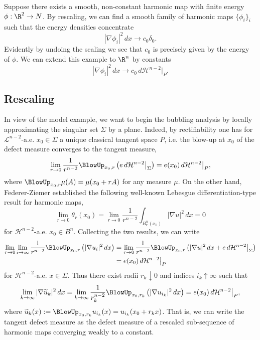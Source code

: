 \documentclass[reqno]{amsart}
\theoremstyle{definition}
\theoremstyle{remark}
\begin{document}
Suppose there exists a smooth, non-constant harmonic map with finite energy $\phi : \R^2 \to N$. By rescaling, we can find a smooth family of harmonic maps $\{ \phi_i \}_i$ such that the energy densities concentrate
	\[ |\nabla \phi_i|^2 \, dx \to c_0 \delta_0. \]
Evidently by undoing the scaling we see that $c_0$ is precisely given by the energy of $\phi$. We can extend this example to $\R^n$ by constants 
	\[ |\nabla \phi_i|^2 \, dx \to c_0 \, d \mathcal H^{n - 2} \big|_P. \]
	
	
\subsection{Rescaling}	

In view of the model example, we want to begin the bubbling analysis by locally approximating the singular set $\Sigma$ by a plane. Indeed, by rectifiability one has for $\mathcal L^{n - 2}$-a.e. $x_0 \in \Sigma$ a unique classical tangent space $P$, i.e. the blow-up at $x_0$ of the defect measure converges to the tangent measure,
	\[ \lim_{r \to 0} \frac{1}{r^{n - 2}}\BlowUp_{x_0, r} \left(e \, d\mathcal H^{n - 2} \big|_{\Sigma}\right) = e(x_0) \, d\mathcal H^{n - 2} \big|_{P}, \]
where $\BlowUp_{x_0, r} \mu (A) = \mu(x_0 + rA)$ for any measure $\mu$. On the other hand, Federer-Ziemer established the following well-known Lebesgue differentiation-type result for harmonic maps, 
	\[\lim_{r \to 0} \theta_r (x_0) = \lim_{r \to 0} \frac{1}{r^{n - 2}} \int_{B_r^n (x_0)} |\nabla u|^2 \, dx = 0 \]
for $\mathcal H^{n -2}$-a.e. $x_0 \in B^n$. Collecting the two results, we can write
	\begin{align*}	
		\lim_{r \to 0} \lim_{i \to \infty} \frac{1}{r^{n - 2}} \BlowUp_{x_0, r} \left( |\nabla u_i|^2 \, dx \right) 
			&= \lim_{r \to 0} \frac{1}{r^{n - 2}} \BlowUp_{x_0, r} \left( |\nabla u|^2 \, dx + e \, d \mathcal H^{n - 2} \big|_{\Sigma} \right) \\
			&= e(x_0) \, d\mathcal H^{n - 2} \big|_{P} 
	\end{align*}			
for $\mathcal H^{n -2}$-a.e. $x \in \Sigma$. Thus there exist radii $r_k \downarrow 0$ and indices $i_k \uparrow \infty$ such that  
	\[ \lim_{k \to \infty} |\nabla \widetilde u_k|^2 \, dx = \lim_{k \to \infty}  \frac{1}{r_k^{n - 2}} \BlowUp_{x_0, r_k} \left( |\nabla u_{i_k}|^2 \, dx \right) = e(x_0) \, d\mathcal H^{n - 2} \big|_{P},  \]
where $\widetilde u_k (x) := \BlowUp_{x_0, r_k} u_{i_k} (x) = u_{i_k} (x_0 + r_k x)$. That is, we can write the tangent defect measure as the defect measure of a rescaled sub-sequence of harmonic maps converging weakly to a constant.
\end{document}
